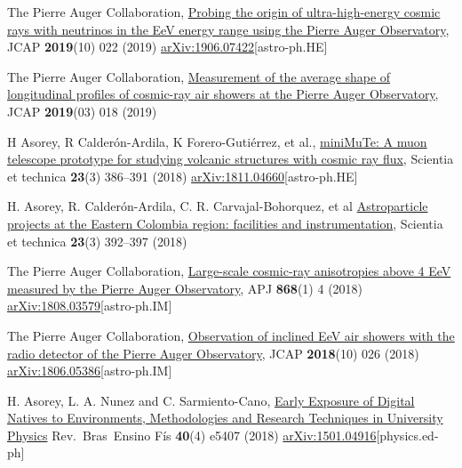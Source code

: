 \begin{etaremune}
\item {}The Pierre Auger Collaboration, \href{https://doi.org/10.1088/1475-7516/2019/10/022}{Probing the origin of ultra-high-energy cosmic rays with neutrinos in the EeV energy range using the Pierre Auger Observatory}, JCAP {\textbf{2019}}(10) 022 (2019) \href{https://arxiv.org/abs/1906.07422}{arXiv:1906.07422}[astro-ph.HE]

\item {}The Pierre Auger Collaboration, \href{https://doi.org/10.1088/1475-7516/2019/03/018}{Measurement of the average shape of longitudinal profiles of cosmic-ray air showers at the Pierre Auger Observatory}, JCAP {\textbf{2019}}(03) 018 (2019) %

\item {} H Asorey, R Calderón-Ardila, K Forero-Gutiérrez, et al., \href{http://dx.doi.org/10.22517/23447214.17501}{miniMuTe: A muon telescope prototype for studying volcanic structures with cosmic ray flux}, Scientia et technica {\textbf{23}}(3) 386--391 (2018) \href{https://arxiv.org/abs/1811.04660}{arXiv:1811.04660}[astro-ph.HE]

\item {}H. Asorey, R. Calderón-Ardila, C. R. Carvajal-Bohorquez, et al \href{http://dx.doi.org/10.22517/23447214.17561}{Astroparticle projects at the Eastern Colombia region: facilities and instrumentation}, Scientia et technica {\textbf{23}}(3) 392--397 (2018)

\item {}The Pierre Auger Collaboration, \href{https://doi.org/10.3847/1538-4357/aae689}{{Large-scale cosmic-ray anisotropies above 4 EeV measured by the Pierre Auger Observatory}}, APJ {\textbf{868}}(1) 4 (2018) \href{https://arxiv.org/abs/1808.03579}{arXiv:1808.03579}[astro-ph.IM]

\item {}The Pierre Auger Collaboration, \href{https://doi.org/10.1088/1475-7516/2018/10/026}{{Observation of inclined EeV air showers with the radio detector of the Pierre Auger Observatory}}, JCAP {\textbf{2018}}(10) 026 (2018) \href{https://arxiv.org/abs/1806.05386}{arXiv:1806.05386}[astro-ph.IM]

\item {} H. Asorey, L. A. Nunez and C. Sarmiento-Cano, \href{http://dx.doi.org/10.1590/1806-9126-rbef-2018-0092}{{Early Exposure of Digital Natives to Environments, Methodologies and Research Techniques in University Physics}} Rev.\ Bras\  Ensino Fís {\textbf{40}}(4) e5407 (2018) \href{http://arxiv.org/abs/1501.04916}{arXiv:1501.04916}[physics.ed-ph]


\end{etaremune}
